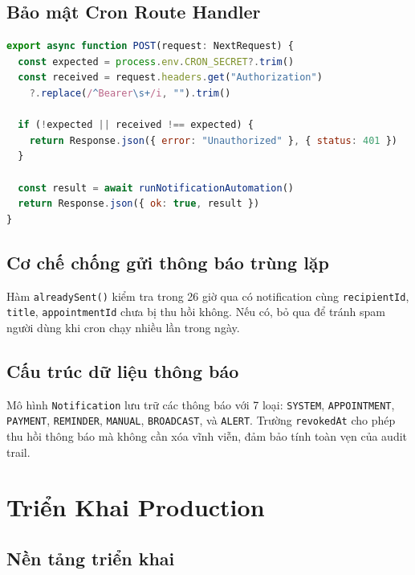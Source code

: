 \documentclass[14pt,a4paper]{report}
\begin{document}
\subsection{Bảo mật Cron Route Handler}

\begin{lstlisting}[language=JavaScript, caption={app/api/cron/notifications/route.ts -- Bảo vệ bằng Bearer token}]
export async function POST(request: NextRequest) {
  const expected = process.env.CRON_SECRET?.trim()
  const received = request.headers.get("Authorization")
    ?.replace(/^Bearer\s+/i, "").trim()

  if (!expected || received !== expected) {
    return Response.json({ error: "Unauthorized" }, { status: 401 })
  }

  const result = await runNotificationAutomation()
  return Response.json({ ok: true, result })
}
\end{lstlisting}

\subsection{Cơ chế chống gửi thông báo trùng lặp}

Hàm \texttt{alreadySent()} kiểm tra trong 26 giờ qua có notification
cùng \texttt{recipientId}, \texttt{title}, \texttt{appointmentId}
chưa bị thu hồi không. Nếu có, bỏ qua để tránh spam người dùng khi
cron chạy nhiều lần trong ngày.

\subsection{Cấu trúc dữ liệu thông báo}

Mô hình \texttt{Notification} lưu trữ các thông báo với 7 loại:
\texttt{SYSTEM}, \texttt{APPOINTMENT}, \texttt{PAYMENT},
\texttt{REMINDER}, \texttt{MANUAL}, \texttt{BROADCAST}, và
\texttt{ALERT}. Trường \texttt{revokedAt} cho phép thu hồi thông báo
mà không cần xóa vĩnh viễn, đảm bảo tính toàn vẹn của audit trail.

\section{Triển Khai Production}

\subsection{Nền tảng triển khai}
\end{document}
